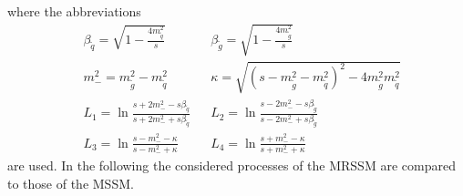 where the abbreviations \cite{Beenakker:1996ch} 
\begin{align}
&\beta_{\tilde{q}} = \sqrt{1-\frac{4 m_{\tilde{q}}^2}{s}} && \beta_{\tilde{g}} = \sqrt{1-\frac{4 m_{\tilde{g}}^2}{s}}\nonumber\\
&m_-^2 = m_{\tilde{g}}^2 - m_{\tilde{q}}^2 && \kappa = \sqrt{(s-m_{\tilde{g}}^2-m_{\tilde{q}}^2)^2-4m_{\tilde{g}}^2m_{\tilde{q}}^2}\nonumber\\
& L_1 = \ln \frac{s+2m_-^2 - s\beta_{\tilde{q}}}{s+2m_-^2 + s\beta_{\tilde{q}}} && L_2= \ln \frac{s - 2m_-^2 - s\beta_{\tilde{g}}}{s - 2m_-^2 + s\beta_{\tilde{g}}}\nonumber\\
& L_3 = \ln \frac{s - m_-^2 - \kappa}{s - m_-^2 + \kappa} && L_4= \ln \frac{s + m_-^2 - \kappa}{s + m_-^2 + \kappa}
\end{align}
are used. In the following the considered processes of the MRSSM are compared to those of the MSSM.

